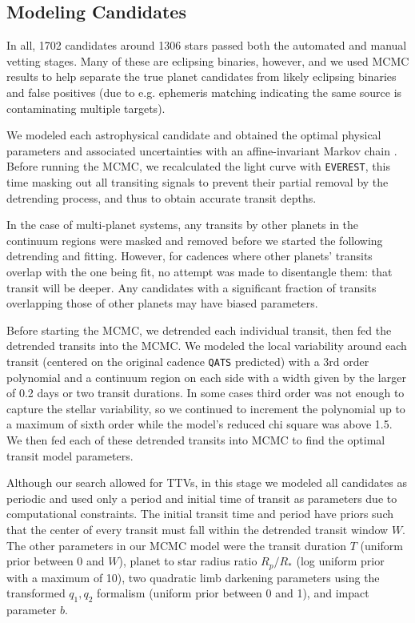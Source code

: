 \documentclass[twocolumn]{aastex62}
\newcommand{\pipeline}[1]{\texttt{#1}}
\newcommand{\nsystems}{1306}
\newcommand{\nastro}{1702}
\begin{document}
\subsection{Modeling Candidates}
\label{mcmc}

In all, \nastro{} candidates around \nsystems{} stars passed both the
automated and manual vetting stages. Many of these are eclipsing
binaries, however, and we used MCMC results to help separate the true
planet candidates from likely eclipsing binaries and false positives
(due to e.g. ephemeris matching indicating the same source is
contaminating multiple targets).

We modeled each astrophysical candidate and obtained the optimal
physical parameters and associated uncertainties with an
affine-invariant Markov chain
\citep[\pipeline{emcee};][]{for13}. Before running the MCMC, we
recalculated the light curve with \pipeline{EVEREST}, this time
masking out all transiting signals to prevent their partial removal by
the detrending process, and thus to obtain accurate transit depths.

In the case of multi-planet systems, any transits by other planets in
the continuum regions were masked and removed before we started the
following detrending and fitting. However, for cadences where other
planets' transits overlap with the one being fit, no attempt was made
to disentangle them: that transit will be deeper. Any candidates with
a significant fraction of transits overlapping those of other planets
may have biased parameters.

Before starting the MCMC, we detrended each individual transit, then
fed the detrended transits into the MCMC. We modeled the local
variability around each transit (centered on the original cadence
\pipeline{QATS} predicted) with a 3rd order polynomial and a continuum
region on each side with a width given by the larger of 0.2 days or
two transit durations. In some cases third order was not enough to
capture the stellar variability, so we continued to increment the
polynomial up to a maximum of sixth order while the model's reduced
chi square was above 1.5.  We then fed each of these detrended
transits into MCMC to find the optimal transit model parameters.

Although our search allowed for TTVs, in this stage we modeled all
candidates as periodic and used only a period and initial time of
transit as parameters due to computational constraints.  The initial
transit time and period have priors such that the center of every
transit must fall within the detrended transit window $W$. The other
parameters in our MCMC model were the transit duration $T$ (uniform
prior between 0 and $W$), planet to star radius ratio $R_p/R_*$ (log
uniform prior with a maximum of 10), two quadratic limb darkening
parameters using the transformed \cite{kip13} $q_1, q_2$ formalism
(uniform prior between 0 and 1), and impact parameter $b$.
\end{document}
